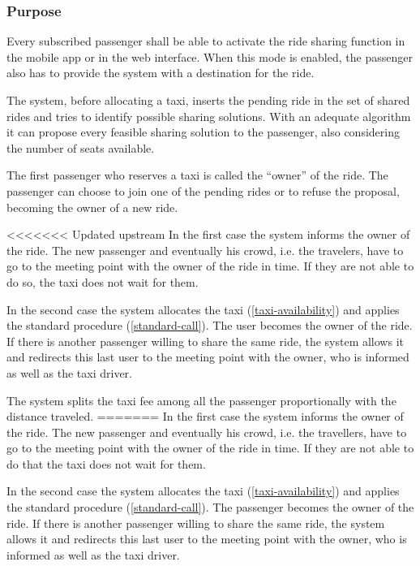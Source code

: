 \label{ride-sharing}
\subsubsection{Purpose}

Every subscribed passenger shall be able to activate the ride sharing function in the mobile app or in the web interface. When this mode is enabled, the passenger also has to provide the system with a destination for the ride.

The system, before allocating a taxi, inserts the pending ride in the set of shared rides and tries to identify possible sharing solutions.
With an adequate algorithm it can propose every feasible sharing solution to the passenger, also considering the number of seats available.

The first passenger who reserves a taxi is called the ``owner'' of the ride.
The passenger can choose to join one of the pending rides or to refuse the proposal, becoming the owner of a new ride.

<<<<<<< Updated upstream
In the first case the system informs the owner of the ride. The new passenger and eventually his crowd, i.e. the travelers, have to go to the meeting point with the owner of the ride in time. If they are not able to do so, the taxi does not wait for them.

In the second case the system allocates the taxi (\autoref{taxi-availability}) and applies the standard procedure (\autoref{standard-call}).  The user becomes the owner of the ride.
If there is another passenger willing to share the same ride, the system allows it and redirects this last user to the meeting point with the owner, who is informed as well as the taxi driver.

The system splits the taxi fee among all the passenger proportionally with the distance traveled.
=======
In the first case the system informs the owner of the ride. The new passenger and eventually his crowd, i.e. the travellers, have to go to the meeting point with the owner of the ride in time. If they are not able to do that the taxi does not wait for them.

In the second case the system allocates the taxi (\ref{taxi-availability}) and applies the standard procedure (\ref{standard-call}).  The passenger becomes the owner of the ride.
If there is another passenger willing to share the same ride, the system allows it and redirects this last user to the meeting point with the owner, who is informed as well as the taxi driver.

